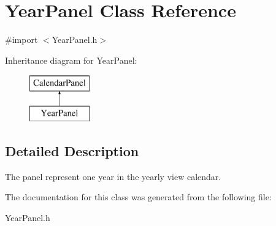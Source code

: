 \hypertarget{interface_year_panel}{\section{\-Year\-Panel \-Class \-Reference}
\label{interface_year_panel}
}


{\ttfamily \#import $<$\-Year\-Panel.\-h$>$}

\-Inheritance diagram for \-Year\-Panel\-:\begin{figure}[H]
\begin{center}
\leavevmode
\includegraphics[height=2.000000cm]{interface_year_panel}
\end{center}
\end{figure}


\subsection{\-Detailed \-Description}
\-The panel represent one year in the yearly view calendar. 

\-The documentation for this class was generated from the following file\-:\begin{DoxyCompactItemize}
\item 
\-Year\-Panel.\-h\end{DoxyCompactItemize}
